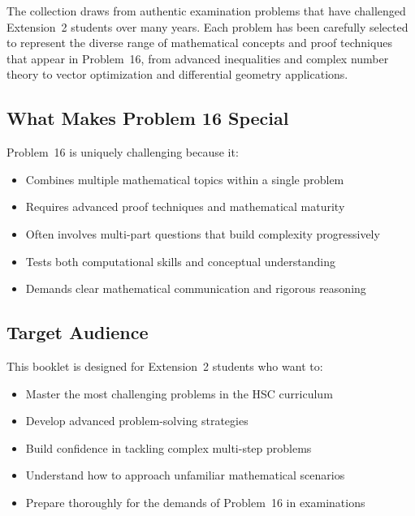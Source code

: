 \documentclass[12pt]{article}
\begin{document}
The collection draws from authentic examination problems that have challenged Extension~2 students over many years. Each problem has been carefully selected to represent the diverse range of mathematical concepts and proof techniques that appear in Problem~16, from advanced inequalities and complex number theory to vector optimization and differential geometry applications.

\subsection{What Makes Problem 16 Special}
Problem~16 is uniquely challenging because it:
\begin{itemize}[leftmargin=*]
  \item Combines multiple mathematical topics within a single problem
  \item Requires advanced proof techniques and mathematical maturity
  \item Often involves multi-part questions that build complexity progressively
  \item Tests both computational skills and conceptual understanding
  \item Demands clear mathematical communication and rigorous reasoning
\end{itemize}

\subsection{Target Audience}
This booklet is designed for Extension~2 students who want to:
\begin{itemize}[leftmargin=*]
  \item Master the most challenging problems in the HSC curriculum
  \item Develop advanced problem-solving strategies
  \item Build confidence in tackling complex multi-step problems
  \item Understand how to approach unfamiliar mathematical scenarios
  \item Prepare thoroughly for the demands of Problem~16 in examinations
\end{itemize}
\end{document}
